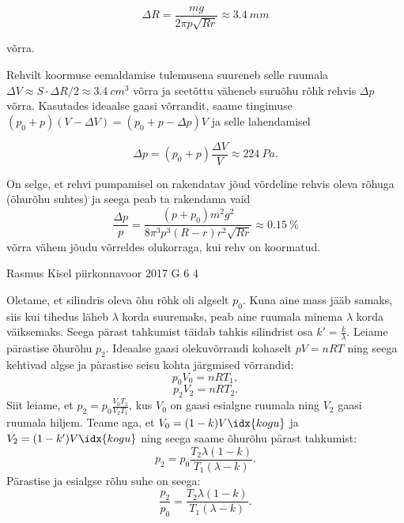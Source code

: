 \documentclass[11pt, twoside]{article}
\begin{document}
{{\begin{equation}
\Delta R=\frac{mg}{2\pi p\sqrt{Rr}}\approx\SI{3.4}{mm}
\end{equation}

\noindent võrra.

Rehvilt koormuse eemaldamise tulemusena suureneb selle ruumala $\Delta V\approx S\cdot\Delta R/2\approx\SI{3.4}{cm^{3}}$ võrra ja seetõttu väheneb suruõhu rõhk rehvis $\Delta p$ võrra. Kasutades ideaalse gaasi võrrandit, saame tingimuse $\left(p_{0}+p\right)\left(V-\Delta V\right)=\left(p_{0}+p-\Delta p\right)V$
ja selle lahendamisel

\begin{equation}
\Delta p=\left(p_{0}+p\right)\frac{\Delta V}{V}\approx\SI{224}{Pa}.
\end{equation}

On selge, et rehvi pumpamisel on rakendatav jõud võrdeline rehvis oleva rõhuga (õhurõhu suhtes) ja seega peab ta rakendama vaid 
\[
\frac{\Delta p}{p}=\frac{\left(p+p_{0}\right)m^{2}g^{2}}{8\pi^{3}p^{3}\left(R-r\right)r^{2}\sqrt{Rr}}\approx\SI{0.15}{\percent}
\]
võrra vähem jõudu võrreldes olukorraga, kui rehv on koormatud.
\fi
}

{Rasmus Kisel} %
{piirkonnavoor} %
{2017} %
{G 6} %
{4} %
{

\ifSolution
Oletame, et silindris oleva õhu rõhk oli algselt $p_{0}$. Kuna aine mass jääb samaks, siis kui tihedus läheb $\lambda$ korda suuremaks, peab aine ruumala minema $\lambda$ korda väiksemaks. Seega pärast tahkumist täidab tahkis silindrist osa $k'=\frac{k}{\lambda}$. Leiame pärastise õhurõhu $p_{2}$. Ideaalse gaasi olekuvõrrandi kohaselt $pV=nRT$ ning seega kehtivad algse ja pärastise seisu kohta järgmised võrrandid:
\begin{equation*}
p_{0}V_{0}=nRT_{1},
\end{equation*}
\begin{equation*}
p_{2}V_{2}=nRT_{2}.
\end{equation*}
Siit leiame, et $p_{2}=p_{0}\frac{V_{0}T_{2}}{V_{2}T_{1}}$, kus $V_{0}$ on gaasi esialgne ruumala ning $V_{2}$ gaasi ruumala hiljem. Teame aga, et $V_{0}=(1-k)V\idx{kogu}$ ja $V_{2}=(1-k')V\idx{kogu}$ ning seega saame õhurõhu pärast tahkumist:
\begin{equation*}
p_{2}=p_{0}\frac{T_{2}\lambda (1-k)}{T_{1}(\lambda-k)}.
\end{equation*}
Pärastise ja esialgse rõhu suhe on seega:
\begin{equation*}
\frac{p_{2}}{p_{0}}=\frac{T_{2}\lambda(1-k)}{T_{1}(\lambda-k)}.
\end{equation*}
\fi
}

}
\end{document}
